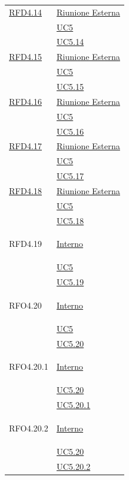 \begin{longtable}{|>{\centering}m{5cm}|m{5cm}<{\centering}|}
\hyperlink{RFD4.14}{RFD4.14} & \hyperlink{Riunione Esterna}{Riunione Esterna}\\
& \hyperref[UC5]{UC5}\\
& \hyperref[UC5.14]{UC5.14}\\ \hline

\hyperlink{RFD4.15}{RFD4.15} & \hyperlink{Riunione Esterna}{Riunione Esterna}\\
& \hyperref[UC5]{UC5}\\
& \hyperref[UC5.15]{UC5.15}\\ \hline

\hyperlink{RFD4.16}{RFD4.16} & \hyperlink{Riunione Esterna}{Riunione Esterna}\\
& \hyperref[UC5]{UC5}\\
& \hyperref[UC5.16]{UC5.16}\\ \hline

\hyperlink{RFD4.17}{RFD4.17} & \hyperlink{Riunione Esterna}{Riunione Esterna}\\
& \hyperref[UC5]{UC5}\\
& \hyperref[UC5.17]{UC5.17}\\ \hline

\hyperlink{RFD4.18}{RFD4.18} & \hyperlink{Riunione Esterna}{Riunione Esterna}\\
& \hyperref[UC5]{UC5}\\
& \hyperref[UC5.18]{UC5.18}\\ \hline

\hypertarget{RFD4.19}{RFD4.19} & \hyperlink{Interno}{Interno}\\
&\hyperref[UC5]{UC5}\\
&\hyperref[UC5.19]{UC5.19}\\ \hline

\hypertarget{RFO4.20}{RFO4.20} & \hyperlink{Interno}{Interno}\\
&\hyperref[UC5]{UC5}\\
&\hyperref[UC5.20]{UC5.20}\\ \hline

\hypertarget{RFO4.20.1}{RFO4.20.1} & \hyperlink{Interno}{Interno}\\
&\hyperref[UC5.20]{UC5.20}\\
&\hyperref[UC5.20.1]{UC5.20.1}\\ \hline

\hypertarget{RFO4.20.2}{RFO4.20.2} & \hyperlink{Interno}{Interno}\\
&\hyperref[UC5.20]{UC5.20}\\
&\hyperref[UC5.20.2]{UC5.20.2}\\ \hline


\end{longtable}
